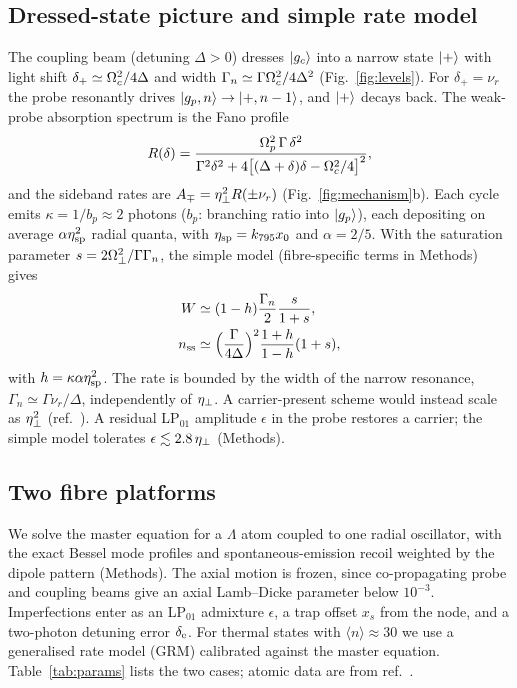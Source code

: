 \documentclass[10pt,twocolumn,a4paper]{article}
\begin{document}
\subsection{Dressed-state picture and simple rate model}
The coupling beam (detuning $\Delta>0$) dresses $|g_c\rangle$ into a narrow state $|+\rangle$ with light shift $\delta_+\simeq\Omega_c^2/4\Delta$ and width $\Gamma_n\simeq\Gamma\Omega_c^2/4\Delta^2$ (Fig.~\ref{fig:levels}). For $\delta_+=\nu_r$ the probe resonantly drives $|g_p,n\rangle\to|+,n-1\rangle$, and $|+\rangle$ decays back. The weak-probe absorption spectrum is the Fano profile\cite{morigi2000,fleischhauer2005}
\begin{equation}
  R(\delta)=\frac{\Omega_p^2\,\Gamma\,\delta^2}{\Gamma^2\delta^2+4\big[(\Delta+\delta)\delta-\Omega_c^2/4\big]^2},
  \label{eq:fano}
\end{equation}
and the sideband rates are $A_\mp=\eta_{\perp}^2R(\pm\nu_r)$ (Fig.~\ref{fig:mechanism}b). Each cycle emits $\kappa=1/b_p\approx2$ photons ($b_p$: branching ratio into $|g_p\rangle$), each depositing on average $\alpha\eta_{\rm sp}^2$ radial quanta, with $\eta_{\rm sp}=k_{795}x_0$ and $\alpha=2/5$. With the saturation parameter $s=2\Omega_\perp^2/\Gamma\Gamma_n$, the simple model\cite{morigi2000} (fibre-specific terms in Methods) gives
\begin{equation}
\begin{aligned}
  W&\simeq(1-h)\frac{\Gamma_n}{2}\frac{s}{1+s},\\
  n_{\rm ss}&\simeq\Big(\frac{\Gamma}{4\Delta}\Big)^2\frac{1+h}{1-h}(1+s),
\end{aligned}
  \label{eq:simple}
\end{equation}
with $h=\kappa\alpha\eta_{\rm sp}^2$. The rate is bounded by the width of the narrow resonance, $\Gamma_n\simeq\Gamma\nu_r/\Delta$, independently of $\eta_{\perp}$. A carrier-present scheme would instead scale as $\eta_{\perp}^2$ (ref.~). A residual LP$_{01}$ amplitude $\epsilon$ in the probe restores a carrier; the simple model tolerates $\epsilon\lesssim2.8\,\eta_{\perp}$ (Methods).

\subsection{Two fibre platforms}
We solve the master equation for a $\Lambda$ atom coupled to one radial oscillator, with the exact Bessel mode profiles and spontaneous-emission recoil weighted by the dipole pattern\cite{cirac1992} (Methods). The axial motion is frozen, since co-propagating probe and coupling beams give an axial Lamb--Dicke parameter below $10^{-3}$. Imperfections enter as an LP$_{01}$ admixture $\epsilon$, a trap offset $x_s$ from the node, and a two-photon detuning error $\delta_{\rm e}$. For thermal states with $\langle n\rangle\approx30$ we use a generalised rate model (GRM) calibrated against the master equation. Table~\ref{tab:params} lists the two cases; atomic data are from ref.~.
\end{document}
